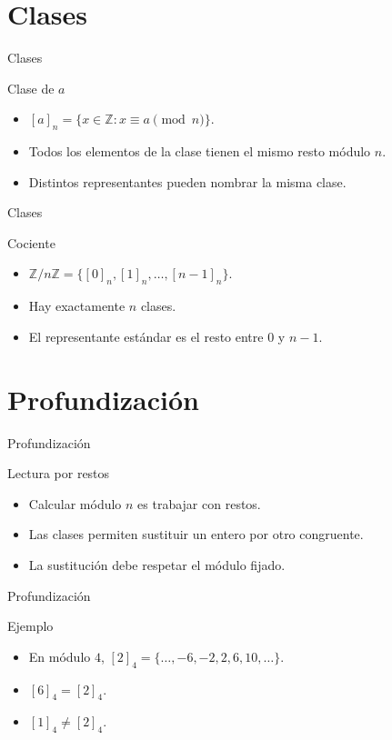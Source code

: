 \documentclass[aspectratio=169,11pt]{beamer}
\begin{document}
\section{Clases}

\begin{frame}{Clases}
\begin{block}{Clase de \(a\)}
\begin{itemize}
  \item \([a]_n=\{x\in\mathbb{Z}:x\equiv a\pmod n\}\).
  \item Todos los elementos de la clase tienen el mismo resto módulo \(n\).
  \item Distintos representantes pueden nombrar la misma clase.
\end{itemize}
\end{block}
\end{frame}

\begin{frame}{Clases}
\begin{block}{Cociente}
\begin{itemize}
  \item \(\mathbb{Z}/n\mathbb{Z}=\{[0]_n,[1]_n,\ldots,[n-1]_n\}\).
  \item Hay exactamente \(n\) clases.
  \item El representante estándar es el resto entre \(0\) y \(n-1\).
\end{itemize}
\end{block}
\end{frame}

\section{Profundización}

\begin{frame}{Profundización}
\begin{block}{Lectura por restos}
\begin{itemize}
  \item Calcular módulo \(n\) es trabajar con restos.
  \item Las clases permiten sustituir un entero por otro congruente.
  \item La sustitución debe respetar el módulo fijado.
\end{itemize}
\end{block}
\end{frame}

\begin{frame}{Profundización}
\begin{block}{Ejemplo}
\begin{itemize}
  \item En módulo \(4\), \([2]_4=\{\ldots,-6,-2,2,6,10,\ldots\}\).
  \item \([6]_4=[2]_4\).
  \item \([1]_4\neq [2]_4\).
\end{itemize}
\end{block}
\end{frame}
\end{document}
